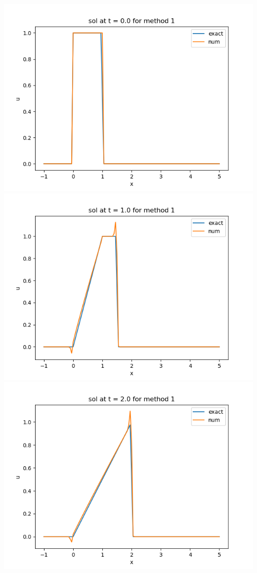 \documentclass{article}
\begin{document}
\begin{center}
	\includegraphics[scale=.23]{hw13 sol t = 0 method 1}
	\includegraphics[scale=.23]{hw13 sol t = 1 method 1}
	\includegraphics[scale=.23]{hw13 sol t = 2 method 1}

\end{center}
\end{document}
